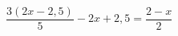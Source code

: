 \begin{ex}[type=equation]
	\begin{condition}
		$\dfrac{3(2x - 2,5)}{5} - 2x + 2,5 = \dfrac{2 - x}{2}$
	\end{condition}
\end{ex}